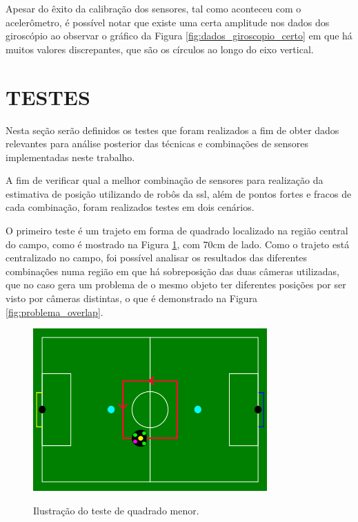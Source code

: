 \documentclass[acronym, symbols, table]{fei}
\begin{document}
	Apesar do êxito da calibração dos sensores, tal como aconteceu com o acelerômetro, é possível notar que existe uma certa amplitude nos dados dos giroscópio ao observar o gráfico da Figura \ref{fig:dados_giroscopio_certo} em que há muitos valores discrepantes, que são os círculos ao longo do eixo vertical.
	
	\section{TESTES}\label{sec:metodologia_testes}
	
		Nesta seção serão definidos os testes que foram realizados a fim de obter dados relevantes para análise posterior das técnicas e combinações de sensores implementadas neste trabalho.
		
		A fim de verificar qual a melhor combinação de sensores para realização da estimativa de posição utilizando  de robôs da \acrshort{ssl}, além de pontos fortes e fracos de cada combinação, foram realizados testes em dois cenários.
		
		O primeiro teste é um trajeto em forma de quadrado localizado na região central do campo, como é mostrado na Figura \ref{fig:representacao_teste_quadrado_menor}, com 70cm de lado. Como o trajeto está centralizado no campo, foi possível analisar os resultados das diferentes combinações numa região em que há sobreposição das duas câmeras utilizadas, que no caso gera um problema de o mesmo objeto ter diferentes posições por ser visto por câmeras distintas, o que é demonstrado na Figura \ref{fig:problema_overlap}.
		
		\begin{figure}[!htb]
			\centering
			\caption{Ilustração do teste de quadrado menor.}
			\includegraphics[width=0.80\textwidth]{representacao_teste_quadrado_menor.png}
			\label{fig:representacao_teste_quadrado_menor}
		\end{figure}
	
\end{document}
